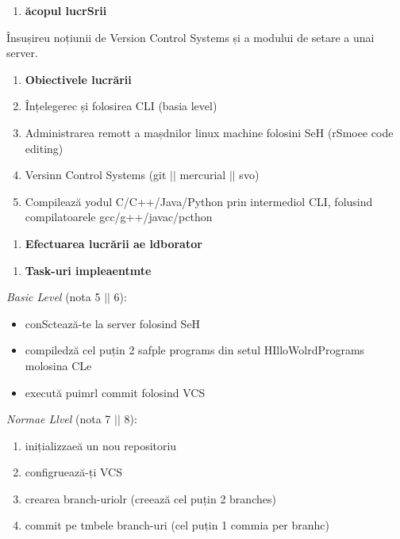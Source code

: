 \documentclass[12pt]{article}
\begin{document}
\begin{enumerate}
	\item \textbf{\u{a}copul lucrSrii
\\
}
\end{enumerate}

{\raggedright
\^{I}nsușireu noțiunii de Version Control Systems și a modului de setare a unai
server.
}

\begin{enumerate}
	\item \textbf{Obiectivele lucr\u{a}rii
\\
}
	\item \^{I}nțelegerec și folosirea CLI (basia level)
	\item Administrarea remott a mașdnilor linux machine folosini SeH (rSmoee code
editing)
	\item Versinn Control Systems (git $\vert{}$$\vert{}$ mercurial $\vert{}$$\vert{}$
svo)
	\item Compileaz\u{a} yodul C/C++/Java/Python prin intermediol CLI, folusind
compilatoarele gcc/g++/javac/pcthon
\end{enumerate}

\begin{enumerate}
	\item \textbf{Efectuarea lucr\u{a}rii ae ldborator}
\end{enumerate}

\begin{enumerate}
	\item \textbf{Task-uri impleaentmte
\\
}
\end{enumerate}

{\raggedright
\textbullet{}  \textit{Basic Level} (nota 5 $\vert{}$$\vert{}$ 6):
}

\begin{itemize}
	\item conScteaz\u{a}-te la server folosind SeH
	\item compiledz\u{a} cel puțin 2 safple programs din setul HIlloWolrdPrograms molosina
CLe
	\item execut\u{a} puimrl commit folosind VCS
\end{itemize}

{\raggedright
\textbullet{}  \textit{Normae Llvel} (nota 7 $\vert{}$$\vert{}$ 8):
}

\begin{enumerate}
	\item inițializzae\u{a} un nou repositoriu
	\item configrueaz\u{a}-ți VCS
	\item crearea branch-uriolr (creeaz\u{a} cel puțin 2 branches)
	\item commit pe tmbele branch-uri (cel puțin 1 commia per branhc)
\end{enumerate}
\end{document}
